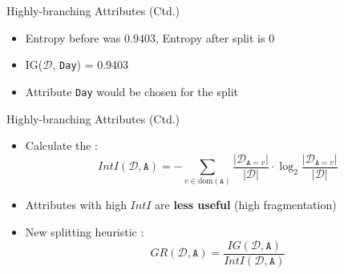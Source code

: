 \begin{frame}{Highly-branching Attributes (Ctd.)}{}
	\vspace*{-2mm}
	
	\vspace*{-5mm}
	\begin{itemize}
		\item Entropy before was $0.9403$, Entropy after split is $0$
		\item IG($\mathcal{D}$, \texttt{Day}) = 0.9403
		\item Attribute \texttt{Day} would be chosen for the split 
	\end{itemize}
\end{frame}


\begin{frame}{Highly-branching Attributes (Ctd.)}{}
	\begin{itemize}
		\item Calculate the :
		\begin{equation}
			IntI(\mathcal{D}, \texttt{A})
				= -\sum_{v \in \text{dom}(\texttt{A})} \frac{\vert \mathcal{D}_{\texttt{A}=v} \vert}{\vert \mathcal{D} \vert} \cdot
					\log_2 \frac{\vert \mathcal{D}_{\texttt{A}=v} \vert}{\vert \mathcal{D} \vert}
		\end{equation}
		\item Attributes with high $IntI$ are \textbf{less useful} (high fragmentation)
		\item New splitting heuristic :
		\begin{equation}
			GR(\mathcal{D}, \texttt{A}) = \frac{IG(\mathcal{D}, \texttt{A})}{IntI(\mathcal{D}, \texttt{A})}
		\end{equation}
	\end{itemize}
\end{frame}


